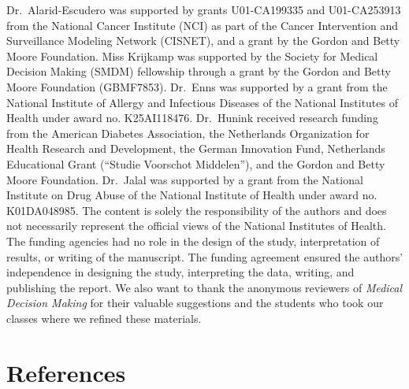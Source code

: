\documentclass[
]{article}
\begin{document}
Dr.~Alarid-Escudero was supported by grants U01-CA199335 and U01-CA253913 from the National Cancer Institute (NCI) as part of the Cancer Intervention and Surveillance Modeling Network (CISNET), and a grant by the Gordon and Betty Moore Foundation. Miss Krijkamp was supported by the Society for Medical Decision Making (SMDM) fellowship through a grant by the Gordon and Betty Moore Foundation (GBMF7853). Dr.~Enns was supported by a grant from the National Institute of Allergy and Infectious Diseases of the National Institutes of Health under award no. K25AI118476. Dr.~Hunink received research funding from the American Diabetes Association, the Netherlands Organization for Health Research and Development, the German Innovation Fund, Netherlands Educational Grant (``Studie Voorschot Middelen''), and the Gordon and Betty Moore Foundation. Dr.~Jalal was supported by a grant from the National Institute on Drug Abuse of the National Institute of Health under award no. K01DA048985. The content is solely the responsibility of the authors and does not necessarily represent the official views of the National Institutes of Health. The funding agencies had no role in the design of the study, interpretation of results, or writing of the manuscript. The funding agreement ensured the authors' independence in designing the study, interpreting the data, writing, and publishing the report. We also want to thank the anonymous reviewers of \emph{Medical Decision Making} for their valuable suggestions and the students who took our classes where we refined these materials.

\hypertarget{references}{%
\section*{References}\label{references}}
\end{document}
